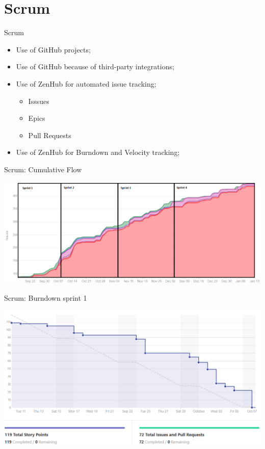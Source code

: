 \documentclass{beamer}
\begin{document}
\section{Scrum}
\begin{frame}{Scrum}
	\begin{itemize}
		\item Use of GitHub projects;
		\item Use of GitHub because of third-party integrations;		
		\item Use of ZenHub for automated issue tracking;
		\begin{itemize}
			\item Isssues
			\item Epics
			\item Pull Requests
		\end{itemize}
		\item Use of ZenHub for Burndown and Velocity tracking;
	\end{itemize}
\end{frame}
\begin{frame}{Scrum: Cumulative Flow}
	\begin{center}
		\includegraphics[width=\linewidth]{images/flow.png}
	\end{center}
\end{frame}
\begin{frame}{Scrum: Burndown sprint 1}
	\begin{center}
		\includegraphics[width=\linewidth]{images/burn1.png}
	\end{center}
\end{frame}
\end{document}

